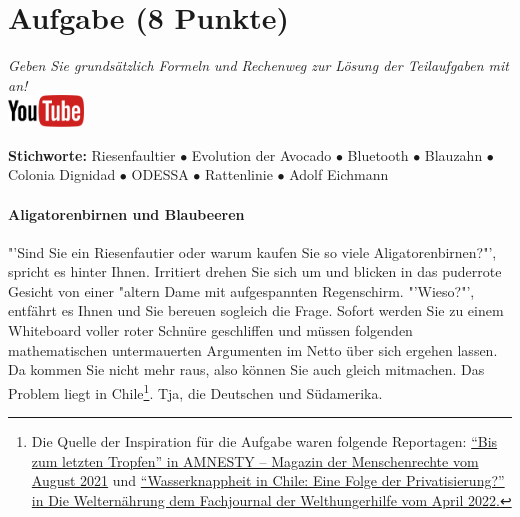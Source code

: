 \documentclass[a4paper, 9pt]{scrartcl}\usepackage[]{graphicx}\usepackage[]{xcolor}
\begin{document}
 
\clearpage

\section{Aufgabe \hfill (8 Punkte)}

\textit{Geben Sie grunds{\"a}tzlich Formeln und Rechenweg zur L{\"o}sung der
  Teilaufgaben mit an!} \\[1Ex]

\hfill\href{https://youtu.be/https://youtu.be/k2G52hMIfqk}{\includegraphics[width = 2cm]{img/youtube}} %
\hspace{2Ex}

{\tiny\textbf{Stichworte:} Riesenfaultier $\bullet$ Evolution der Avocado $\bullet$ Bluetooth $ \bullet$ Blauzahn $\bullet$ Colonia Dignidad $\bullet$ ODESSA $\bullet$ Rattenlinie $\bullet$ Adolf Eichmann}


\paragraph{Aligatorenbirnen und Blaubeeren}



"'Sind Sie ein Riesenfautier oder warum kaufen Sie so viele
Aligatorenbirnen?"', spricht es hinter Ihnen. Irritiert drehen Sie sich um
und blicken in das puderrote Gesicht von einer {"a}ltern Dame mit aufgespannten Regenschirm. "'Wieso?"', entfährt es
Ihnen und Sie bereuen sogleich die Frage. Sofort werden Sie zu einem
Whiteboard voller roter Schnüre geschliffen und müssen folgenden
mathematischen untermauerten Argumenten im Netto über sich ergehen
lassen. Da kommen Sie nicht mehr raus, also können Sie auch gleich
mitmachen. Das Problem liegt in Chile\footnote{Die Quelle der Inspiration
  für die Aufgabe waren folgende Reportagen:
  \href{https://www.amnesty.ch/de/ueber-amnesty/publikationen/magazin-amnesty/2021-3/bis-zum-letzten-tropfen}{"`Bis
  zum letzten Tropfen"' in AMNESTY – Magazin der Menschenrechte vom August
  2021} und
\href{https://www.welthungerhilfe.de/welternaehrung/rubriken/klima-ressourcen/wassernot-in-chile-eine-folge-der-privatisierung}{"`Wasserknappheit
  in Chile: Eine Folge der Privatisierung?"' in Die Welternährung dem
  Fachjournal der Welthungerhilfe vom April 2022.}}. Tja, die Deutschen und Südamerika.\\
\end{document}
